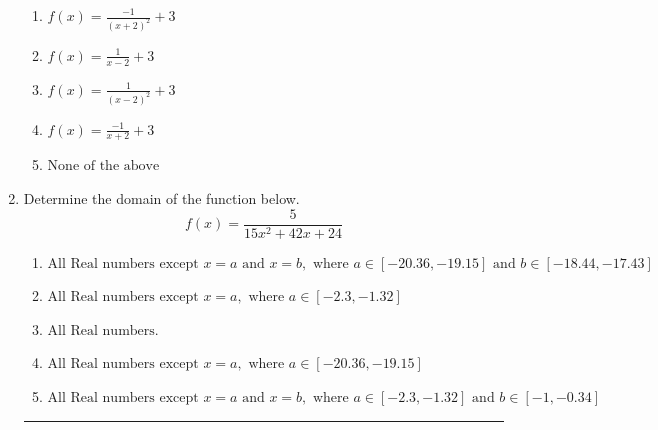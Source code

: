 \documentclass[14pt]{extbook}
\newcommand{\litem}[1]{\item#1\hspace*{-1cm}\rule{\textwidth}{0.4pt}}
\begin{document}
\begin{enumerate}
{\begin{center}
\end{center}
\begin{enumerate}[label=\Alph*.]
\item \( f(x) = \frac{-1}{(x + 2)^2} + 3 \)
\item \( f(x) = \frac{1}{x - 2} + 3 \)
\item \( f(x) = \frac{1}{(x - 2)^2} + 3 \)
\item \( f(x) = \frac{-1}{x + 2} + 3 \)
\item \( \text{None of the above} \)

\end{enumerate} }
\litem{
Determine the domain of the function below.\[ f(x) = \frac{5}{15x^{2} +42 x + 24} \]\begin{enumerate}[label=\Alph*.]
\item \( \text{All Real numbers except } x = a \text{ and } x = b, \text{ where } a \in [-20.36, -19.15] \text{ and } b \in [-18.44, -17.43] \)
\item \( \text{All Real numbers except } x = a, \text{ where } a \in [-2.3, -1.32] \)
\item \( \text{All Real numbers.} \)
\item \( \text{All Real numbers except } x = a, \text{ where } a \in [-20.36, -19.15] \)
\item \( \text{All Real numbers except } x = a \text{ and } x = b, \text{ where } a \in [-2.3, -1.32] \text{ and } b \in [-1, -0.34] \)

\end{enumerate} }
\end{enumerate}
\end{document}

